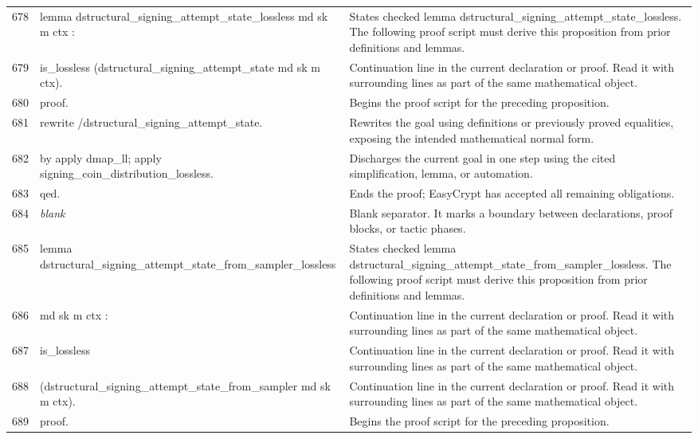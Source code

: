 \documentclass[10pt]{article}
\begin{document}
\begin{longtable}{r L{0.53\textwidth} L{0.37\textwidth}}
678 & {\ttfamily\scriptsize lemma dstructural\_signing\_attempt\_state\_lossless md sk m ctx :} & States checked lemma dstructural\_signing\_attempt\_state\_lossless.  The following proof script must derive this proposition from prior definitions and lemmas. \\
679 & {\ttfamily\scriptsize   is\_lossless (dstructural\_signing\_attempt\_state md sk m ctx).} & Continuation line in the current declaration or proof.  Read it with surrounding lines as part of the same mathematical object. \\
680 & {\ttfamily\scriptsize proof.} & Begins the proof script for the preceding proposition. \\
681 & {\ttfamily\scriptsize rewrite /dstructural\_signing\_attempt\_state.} & Rewrites the goal using definitions or previously proved equalities, exposing the intended mathematical normal form. \\
682 & {\ttfamily\scriptsize by apply dmap\_ll; apply signing\_coin\_distribution\_lossless.} & Discharges the current goal in one step using the cited simplification, lemma, or automation. \\
683 & {\ttfamily\scriptsize qed.} & Ends the proof; EasyCrypt has accepted all remaining obligations. \\
684 & {\ttfamily\scriptsize \emph{blank}} & Blank separator.  It marks a boundary between declarations, proof blocks, or tactic phases. \\
685 & {\ttfamily\scriptsize lemma dstructural\_signing\_attempt\_state\_from\_sampler\_lossless} & States checked lemma dstructural\_signing\_attempt\_state\_from\_sampler\_lossless.  The following proof script must derive this proposition from prior definitions and lemmas. \\
686 & {\ttfamily\scriptsize    md sk m ctx :} & Continuation line in the current declaration or proof.  Read it with surrounding lines as part of the same mathematical object. \\
687 & {\ttfamily\scriptsize   is\_lossless} & Continuation line in the current declaration or proof.  Read it with surrounding lines as part of the same mathematical object. \\
688 & {\ttfamily\scriptsize     (dstructural\_signing\_attempt\_state\_from\_sampler md sk m ctx).} & Continuation line in the current declaration or proof.  Read it with surrounding lines as part of the same mathematical object. \\
689 & {\ttfamily\scriptsize proof.} & Begins the proof script for the preceding proposition. \\

\end{longtable}
\end{document}
